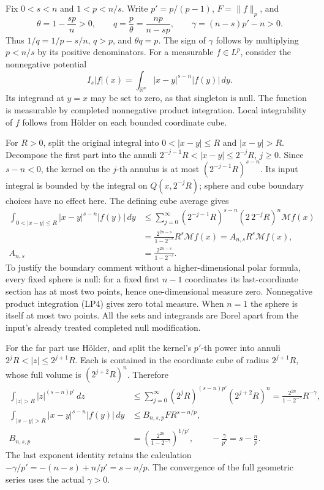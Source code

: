 \documentclass[
  11pt,
]{article}
\begin{document}
Fix \(0<s<n\) and \(1<p<n/s\). Write \(p'=p/(p-1)\), \(F=\|f\|_p\), and
\[
 \theta=1-\frac{sp}{n}>0,\qquad
 q=\frac p\theta=\frac{np}{n-sp},\qquad
 \gamma=(n-s)p'-n>0.                                          \tag{FI7}
\] Thus \(1/q=1/p-s/n\), \(q>p\), and \(\theta q=p\). The sign of
\(\gamma\) follows by multiplying \(p<n/s\) by its positive
denominators. For a measurable \(f\in L^p\), consider the nonnegative
potential \[
 I_s|f|(x)=\int_{\mathbb R^n}|x-y|^{s-n}|f(y)|\,dy .
\] Its integrand at \(y=x\) may be set to zero, as that singleton is
null. The function is measurable by completed nonnegative product
integration. Local integrability of \(f\) follows from Hölder on each
bounded coordinate cube.

For \(R>0\), split the original integral into \(0<|x-y|\leq R\) and
\(|x-y|>R\). Decompose the first part into the annuli
\(2^{-j-1}R<|x-y|\leq2^{-j}R\), \(j\geq0\). Since \(s-n<0\), the kernel
on the \(j\)-th annulus is at most \((2^{-j-1}R)^{s-n}\). Its input
integral is bounded by the integral on \(Q(x,2^{-j}R)\); sphere and cube
boundary choices have no effect here. The defining cube average gives \[
 \begin{split}
 \int_{0<|x-y|\leq R}|x-y|^{s-n}|f(y)|\,dy
 &\leq\sum_{j=0}^\infty
       (2^{-j-1}R)^{s-n}(2\,2^{-j}R)^n\mathcal Mf(x)\\
 &=\frac{2^{2n-s}}{1-2^{-s}}R^s\mathcal Mf(x)
   =A_{n,s}R^s\mathcal Mf(x),\\
 A_{n,s}&=\frac{2^{2n-s}}{1-2^{-s}} .
 \end{split}                                                   \tag{FI8}
\] To justify the boundary comment without a higher-dimensional polar
formula, every fixed sphere is null: for a fixed first \(n-1\)
coordinates its last-coordinate section has at most two points, hence
one-dimensional measure zero. Nonnegative product integration (LP4)
gives zero total measure. When \(n=1\) the sphere is itself at most two
points. All the sets and integrands are Borel apart from the input's
already treated completed null modification.

For the far part use Hölder, and split the kernel's \(p'\)-th power into
annuli \(2^jR<|z|\leq2^{j+1}R\). Each is contained in the coordinate
cube of radius \(2^{j+1}R\), whose full volume is \((2^{j+2}R)^n\).
Therefore \[
 \begin{split}
 \int_{|z|>R}|z|^{(s-n)p'}\,dz
 &\leq\sum_{j=0}^\infty
           (2^jR)^{(s-n)p'}(2^{j+2}R)^n
   =\frac{2^{2n}}{1-2^{-\gamma}}R^{-\gamma},\\
 \int_{|x-y|>R}|x-y|^{s-n}|f(y)|\,dy
 &\leq B_{n,s,p}F R^{s-n/p},\\
 B_{n,s,p}
 &=\left(\frac{2^{2n}}{1-2^{-\gamma}}\right)^{1/p'},
 \qquad -\frac{\gamma}{p'}=s-\frac np .
 \end{split}                                                   \tag{FI9}
\] The last exponent identity retains the calculation
\(-\gamma/p'=-(n-s)+n/p'=s-n/p\). The convergence of the full geometric
series uses the actual \(\gamma>0\).
\end{document}
